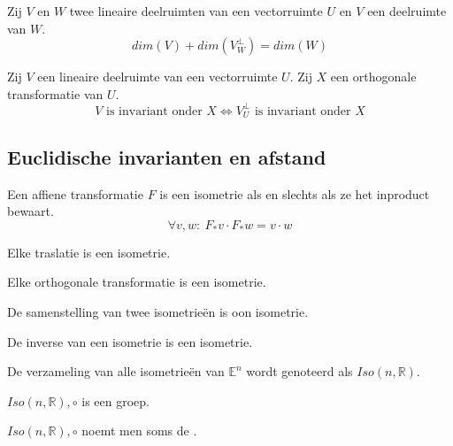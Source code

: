 \documentclass[main.tex]{subfiles}
\begin{document}
\begin{st}
  Zij $V$ en $W$ twee lineaire deelruimten van een vectorruimte $U$ en $V$ een deelruimte van $W$.
  \[ dim(V) + dim(V^{\bot}_{W}) = dim(W) \]
\end{st}

\begin{st}
  Zij $V$ een lineaire deelruimte van een vectorruimte $U$.
  Zij $X$ een orthogonale transformatie van $U$.
  \[ V \text{ is invariant onder } X \Leftrightarrow V^{\bot}_{U} \text{ is invariant onder } X \]
\end{st}

\subsection{Euclidische invarianten en afstand}
\label{sec:eucl-invar-en}

\begin{st}
  Een affiene transformatie $F$ is een isometrie als en slechts als ze het inproduct bewaart.
  \[ \forall v,w:\ F_{*}v \cdot F_{*}w = v \cdot w \]
\end{st}

\begin{st}
  \label{st:translatie-isometrie}
  Elke traslatie is een isometrie.
\end{st}

\begin{st}
  Elke orthogonale transformatie is een isometrie.
\end{st}

\begin{st}
  \label{st:samenstelling-isometrieen-intern}
  De samenstelling van twee isometrie\"en is oon isometrie.
\end{st}

\begin{st}
  De inverse van een isometrie is een isometrie.
\end{st}

\begin{de}
  De verzameling van alle isometrie\"en van $\mathbb{E}^{n}$ wordt genoteerd als $Iso(n,\mathbb{R})$.
\end{de}

\begin{st}
  $Iso(n,\mathbb{R}),\circ$ is een groep.
\end{st}

\begin{de}
  $Iso(n,\mathbb{R}),\circ$ noemt men soms de .
\end{de}
\end{document}
